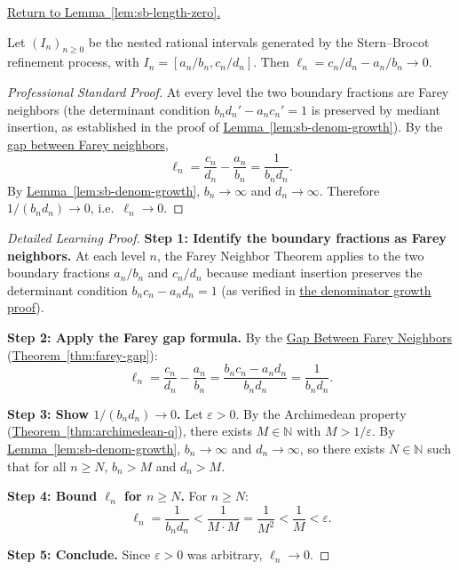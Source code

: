 
\newpage
{}
\label{prf:sb-length-zero}

\begin{remark*}[Return]
\hyperref[lem:sb-length-zero]{Return to Lemma~\ref*{lem:sb-length-zero}.}
\end{remark*}

\begin{lemma*}
Let $(I_n)_{n \geq 0}$ be the nested rational intervals generated by the
Stern--Brocot refinement process, with $I_n = [a_n/b_n, c_n/d_n]$.
Then $\ell_n = c_n/d_n - a_n/b_n \to 0$.
\end{lemma*}

\begin{proof}[Professional Standard Proof]
\LRAProofBodyStart
At every level the two boundary fractions are Farey neighbors (the
determinant condition $b_n d_n' - a_n c_n' = 1$ is preserved by mediant
insertion, as established in the proof of
\hyperref[lem:sb-denom-growth]{Lemma~\ref*{lem:sb-denom-growth}}).
By the \hyperref[thm:farey-gap]{gap between Farey neighbors},
\[
\ell_n = \frac{c_n}{d_n} - \frac{a_n}{b_n} = \frac{1}{b_n d_n}.
\]
By \hyperref[lem:sb-denom-growth]{Lemma~\ref*{lem:sb-denom-growth}},
$b_n \to \infty$ and $d_n \to \infty$.  Therefore $1/(b_n d_n) \to 0$,
i.e.\ $\ell_n \to 0$.
\end{proof}

\begin{proof}[Detailed Learning Proof]
\LRAProofBodyStart
\textbf{Step 1: Identify the boundary fractions as Farey neighbors.}
At each level $n$, the Farey Neighbor Theorem applies to the two boundary
fractions $a_n/b_n$ and $c_n/d_n$ because mediant insertion preserves
the determinant condition $b_n c_n - a_n d_n = 1$
(as verified in \hyperref[prf:sb-denom-growth]{the denominator growth proof}).

\textbf{Step 2: Apply the Farey gap formula.}
By the \hyperref[thm:farey-gap]{Gap Between Farey Neighbors}
(\hyperref[thm:farey-gap]{Theorem~\ref*{thm:farey-gap}}):
\[
\ell_n = \frac{c_n}{d_n} - \frac{a_n}{b_n} = \frac{b_n c_n - a_n d_n}{b_n d_n} = \frac{1}{b_n d_n}.
\]

\textbf{Step 3: Show $1/(b_n d_n) \to 0$.}
Let $\varepsilon > 0$.  By the Archimedean property
(\hyperref[thm:archimedean-q]{Theorem~\ref*{thm:archimedean-q}}),
there exists $M \in \mathbb{N}$ with $M > 1/\varepsilon$.  By
\hyperref[lem:sb-denom-growth]{Lemma~\ref*{lem:sb-denom-growth}},
$b_n \to \infty$ and $d_n \to \infty$, so there exists $N \in \mathbb{N}$
such that for all $n \geq N$, $b_n > M$ and $d_n > M$.

\textbf{Step 4: Bound $\ell_n$ for $n \geq N$.}
For $n \geq N$:
\[
\ell_n = \frac{1}{b_n d_n} < \frac{1}{M \cdot M} = \frac{1}{M^2} < \frac{1}{M} < \varepsilon.
\]

\textbf{Step 5: Conclude.}
Since $\varepsilon > 0$ was arbitrary, $\ell_n \to 0$.
\end{proof}

